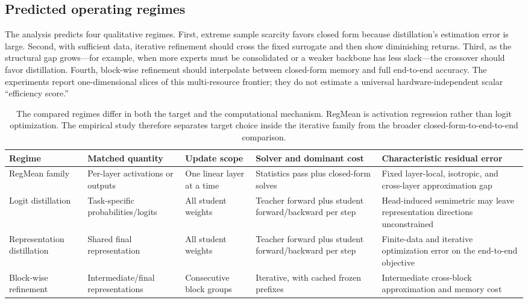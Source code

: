 \documentclass[letterpaper]{article} %
\theoremstyle{plain}
\theoremstyle{definition}
\begin{document}
\subsection{Predicted operating regimes}
\label{sec:predictions}

The analysis predicts four qualitative regimes. First, extreme sample scarcity favors
closed form because distillation's estimation error is large. Second, with sufficient
data, iterative refinement should cross the fixed surrogate and then show diminishing
returns. Third, as the structural gap grows---for example, when more experts must be
consolidated or a weaker backbone has less slack---the crossover should favor
distillation. Fourth, block-wise refinement should interpolate between closed-form memory
and full end-to-end accuracy. The experiments report one-dimensional slices of this
multi-resource frontier; they do not estimate a universal hardware-independent scalar
``efficiency score.''

\begin{table}[tb]
\centering
\small
\setlength{\tabcolsep}{4pt}
\begin{tabular}{p{}p{}p{}p{}p{}}
\toprule
Regime & Matched quantity & Update scope & Solver and dominant cost & Characteristic residual error \\
\midrule
RegMean family & Per-layer activations or outputs & One linear layer at a time & Statistics pass plus closed-form solves & Fixed layer-local, isotropic, and cross-layer approximation gap \\
Logit distillation & Task-specific probabilities/logits & All student weights & Teacher forward plus student forward/backward per step & Head-induced semimetric may leave representation directions unconstrained \\
Representation distillation & Shared final representation & All student weights & Teacher forward plus student forward/backward per step & Finite-data and iterative optimization error on the end-to-end objective \\
Block-wise refinement & Intermediate/final representations & Consecutive block groups & Iterative, with cached frozen prefixes & Intermediate cross-block approximation and memory cost \\
\bottomrule
\end{tabular}
\caption{The compared regimes differ in both the target and the computational mechanism.
RegMean is activation regression rather than logit optimization. The empirical study therefore
separates target choice inside the iterative family from the broader closed-form-to-end-to-end
comparison.}
\label{tab:regime-comparison}
\end{table}
\end{document}
